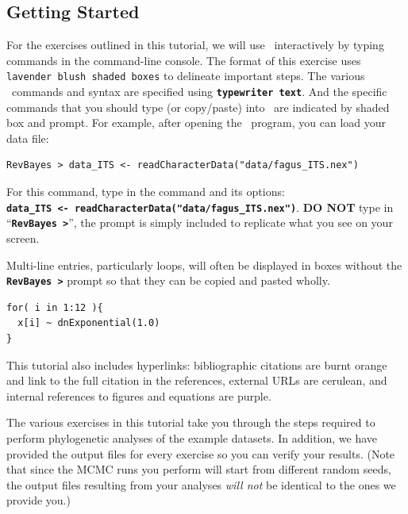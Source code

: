 \documentclass[11pt]{article}
\newcommand{\cl}[1]{{\texttt{\textbf{#1}}}}
\begin{document}
\bigskip
\subsection{Getting Started}

For the exercises outlined in this tutorial, we will use \RevBayes~interactively by typing commands in the command-line console.
The format of this exercise uses \colorbox{shadecolor}{\tt lavender blush shaded boxes} to delineate important steps. 
The various \RevBayes~commands and syntax are specified using \cl{typewriter text}. 
And the specific commands that you should type (or copy/paste) into \RevBayes~are indicated by shaded box and prompt. 
For example, after opening the \RevBayes~program, you can load your data file:

{\tt \begin{snugshade*}
\begin{lstlisting}
RevBayes > data_ITS <- readCharacterData("data/fagus_ITS.nex")
\end{lstlisting}
\end{snugshade*}}

For this command, type in the command and its options:\\ \cl{data\_ITS <- readCharacterData("data/fagus\_ITS.nex")}. 
\textbf{DO NOT} type in ``\cl{RevBayes >}'', the prompt is simply included to replicate what you see on your screen. 

Multi-line entries, particularly loops, will often be displayed in boxes without the \cl{RevBayes >} prompt so that they can be copied and pasted wholly. 
{\tt \begin{snugshade*}
\begin{lstlisting}
for( i in 1:12 ){
  x[i] ~ dnExponential(1.0)
}
\end{lstlisting}
\end{snugshade*}}


This tutorial also includes hyperlinks: bibliographic citations are {\textcolor{citescol}{burnt orange}} and link to the full citation in the references, external URLs are {\textcolor{urlscol}{cerulean}}, and internal references to figures and equations are {\textcolor{linkscol}{purple}}.

The various exercises in this tutorial take you through the steps required to perform phylogenetic analyses of the example datasets. 
In addition, we have provided the output files for every exercise so you can verify your results. (Note that since the MCMC runs you perform will start from different random seeds, the output files resulting from your analyses \textit{will not} be identical to the ones we provide you.)
\end{document}
